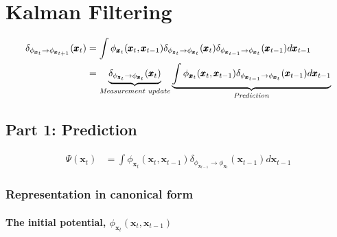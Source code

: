 \chapter{Kalman Filtering}
\label{chapter:filtering_equations}

\begin{align}
\delta_{\phi_{\pmb{x}_{t}} \rightarrow \phi_{\pmb{x}_{t+1}}}(\pmb{x}_{t}) &= \int \phi_{\pmb{x}_{t}}(\pmb{x}_{t}, \pmb{x}_{t-1}) \delta_{\phi_{\pmb{z}_{t}} \rightarrow \phi_{\pmb{x}_{t}}} (\pmb{x}_{t}) \delta_{\phi_{\pmb{x}_{t-1}} \rightarrow \phi_{\pmb{x}_{t}}} (\pmb{x}_{t-1}) d\pmb{x}_{t-1} \nonumber \\
&= \underbrace{ \delta_{\phi_{\pmb{z}_{t}} \rightarrow \phi_{\pmb{x}_{t}}} (\pmb{x}_{t}) }_\text{\textit{Measurement update}} \underbrace{ \int \phi_{\pmb{x}_{t}}(\pmb{x}_{t}, \pmb{x}_{t-1})  \delta_{\phi_{\pmb{x}_{t-1}} \rightarrow \phi_{\pmb{x}_{t}}} (\pmb{x}_{t-1}) d\pmb{x}_{t-1} }_\text{\textit{Prediction}}
\end{align}

\section{Part 1: Prediction}
\label{section:prediction}

\begin{align}
\Psi(\pmb{x}_{t}) &= \int \phi_{\pmb{x}_{t}}(\pmb{x}_{t}, \pmb{x}_{t-1})  \delta_{\phi_{\pmb{x}_{t-1}} \rightarrow \phi_{\pmb{x}_{t}}} (\pmb{x}_{t-1}) d\pmb{x}_{t-1} 
\end{align}

\subsection{Representation in canonical form}
\label{subsection:canonical}


\subsubsection{The initial potential, $\phi_{\pmb{x}_t} (\pmb{x}_{t}, \pmb{x}_{t-1})$}
\label{subsubsection:initial_pot}

